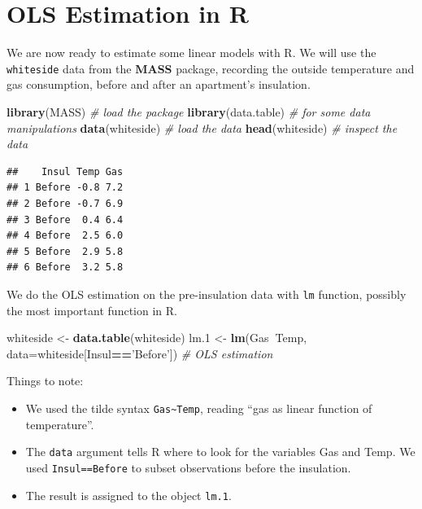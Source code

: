 \documentclass[]{book}
\newenvironment{Shaded}{\begin{snugshade}}{\end{snugshade}}
\newcommand{\KeywordTok}[1]{\textcolor[rgb]{0.13,0.29,0.53}{\textbf{#1}}}
\newcommand{\DataTypeTok}[1]{\textcolor[rgb]{0.13,0.29,0.53}{#1}}
\newcommand{\DecValTok}[1]{\textcolor[rgb]{0.00,0.00,0.81}{#1}}
\newcommand{\StringTok}[1]{\textcolor[rgb]{0.31,0.60,0.02}{#1}}
\newcommand{\CommentTok}[1]{\textcolor[rgb]{0.56,0.35,0.01}{\textit{#1}}}
\newcommand{\OperatorTok}[1]{\textcolor[rgb]{0.81,0.36,0.00}{\textbf{#1}}}
\newcommand{\NormalTok}[1]{#1}
\providecommand{\tightlist}{%
  \setlength{\itemsep}{0pt}\setlength{\parskip}{0pt}}
\theoremstyle{definition}
\theoremstyle{definition}
\theoremstyle{definition}
\theoremstyle{remark}
\begin{document}
\section{OLS Estimation in R}\label{ols-estimation-in-r}

We are now ready to estimate some linear models with R. We will use the
\texttt{whiteside} data from the \textbf{MASS} package, recording the
outside temperature and gas consumption, before and after an apartment's
insulation.

\begin{Shaded}
\begin{Highlighting}[]
\KeywordTok{library}\NormalTok{(MASS) }\CommentTok{# load the package}
\KeywordTok{library}\NormalTok{(data.table) }\CommentTok{# for some data manipulations}
\KeywordTok{data}\NormalTok{(whiteside) }\CommentTok{# load the data}
\KeywordTok{head}\NormalTok{(whiteside) }\CommentTok{# inspect the data}
\end{Highlighting}
\end{Shaded}

\begin{verbatim}
##    Insul Temp Gas
## 1 Before -0.8 7.2
## 2 Before -0.7 6.9
## 3 Before  0.4 6.4
## 4 Before  2.5 6.0
## 5 Before  2.9 5.8
## 6 Before  3.2 5.8
\end{verbatim}

We do the OLS estimation on the pre-insulation data with \texttt{lm}
function, possibly the most important function in R.

\begin{Shaded}
\begin{Highlighting}[]
\NormalTok{whiteside <-}\StringTok{ }\KeywordTok{data.table}\NormalTok{(whiteside)}
\NormalTok{lm.}\DecValTok{1}\NormalTok{ <-}\StringTok{ }\KeywordTok{lm}\NormalTok{(Gas}\OperatorTok{~}\NormalTok{Temp, }\DataTypeTok{data=}\NormalTok{whiteside[Insul}\OperatorTok{==}\StringTok{'Before'}\NormalTok{]) }\CommentTok{# OLS estimation }
\end{Highlighting}
\end{Shaded}

Things to note:

\begin{itemize}
\tightlist
\item
  We used the tilde syntax \texttt{Gas\textasciitilde{}Temp}, reading
  ``gas as linear function of temperature''.
\item
  The \texttt{data} argument tells R where to look for the variables Gas
  and Temp. We used
  \texttt{Insul==\textquotesingle{}Before\textquotesingle{}} to subset
  observations before the insulation.
\item
  The result is assigned to the object \texttt{lm.1}.
\end{itemize}
\end{document}
